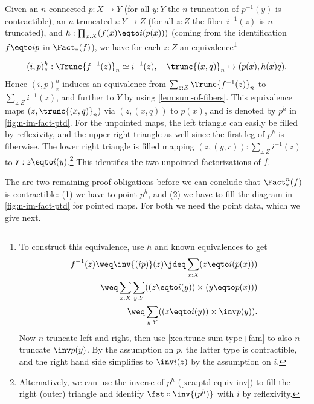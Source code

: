 \begin{remark}
Given an $n$-connected $p: X\to Y$ (\ie for all $y:Y$ the $n$-truncation 
of $p^{-1}(y)$ is contractible), an $n$-truncated $i:Y\to Z$
(\ie for all $z:Z$ the fiber $i^{-1}(z)$ is $n$-truncated), and
$h:\prod_{x:X}(f(x)\eqto i(p(x)))$ (coming from the identification
$f\eqto ip$ in $\Fact_*(f)$),
we have for each $z:Z$ an equivalence\footnote{\label{ft:(i,p)-equiv}%
To construct this equivalence, use $h$ and known equivalences to get 
\begin{align*}
f^{-1}(z)\weq\inv{(ip)}(z)\jdeq\sum_{x:X}(z\eqto i(p(x))) \\
\weq\sum_{x:X}\sum_{y:Y}((z\eqto i(y))\times(y\eqto p(x)))\\
\weq\sum_{y:Y}((z\eqto i(y))\times\inv p(y)).
\end{align*}
Now $n$-truncate left and right, then use \cref{xca:trunc-sum-type+fam}
to also $n$-truncate $\inv p(y)$. By the assumption on $p$,
the latter type is contractible, and the right hand side simplifies 
to $\inv i(z)$ by the assumption on $i$.
}
\begin{marginfigure}
\caption{\label{fig:n-im-fact-ptd}Two $n$-image factorizations of $f$.}
\end{marginfigure}
\[
(i,p)^h_z:\Trunc{f^{-1}(z)}_n\simeq i^{-1}(z), \quad
\trunc{(x,q)}_n \mapsto (p(x),h(x)q).
\]
Hence $(i,p)^h_z$ induces an equivalence 
from $\sum_{z:Z}\Trunc{f^{-1}(z)}_n$ to $\sum_{z:Z}i^{-1}(z)$,
and further to $Y$ by using \cref{lem:sum-of-fibers}.
This equivalence  maps $(z,\trunc{(x,q)}_n)$ 
via $(z,(x,q))$ to $p(x)$, and is denoted by $p^h$ in
\cref{fig:n-im-fact-ptd}. For the unpointed maps, the left triangle
can easily be filled by reflexivity, and the upper right triangle as 
well since the first leg of $p^h$ is fiberwise. The lower right triangle
is filled mapping $(z,(y,r)):\sum_{z:Z}i^{-1}(z)$ to $r : z\eqto i(y)$.\footnote{%
Alternatively, we can use the inverse of $p^h$ (\cref{xca:ptd-equiv-inv})
to fill the right (outer) triangle
and identify $\fst\circ\inv{(p^h)}$ with $i$ by reflexivity.
} 
This identifies the two unpointed factorizations of $f$.

The are two remaining proof obligations before we can conclude
that $\Fact_*^n(f)$ is contractible: (1) we have to point $p^h$,
and (2) we have to fill the diagram in \cref{fig:n-im-fact-ptd}
for pointed maps. For both we need the point data, which we
give next.


\end{remark}
